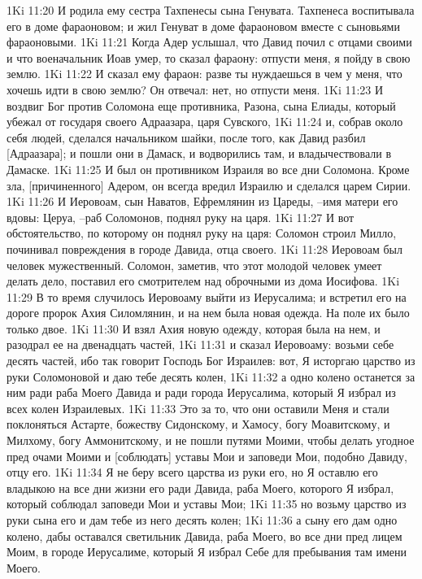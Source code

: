 1Ki 11:20  И родила ему сестра Тахпенесы сына Генувата. Тахпенеса воспитывала его в доме фараоновом; и жил Генуват в доме фараоновом вместе с сыновьями фараоновыми.
1Ki 11:21  Когда Адер услышал, что Давид почил с отцами своими и что военачальник Иоав умер, то сказал фараону: отпусти меня, я пойду в свою землю.
1Ki 11:22  И сказал ему фараон: разве ты нуждаешься в чем у меня, что хочешь идти в свою землю? Он отвечал: нет, но отпусти меня.
1Ki 11:23  И воздвиг Бог против Соломона еще противника, Разона, сына Елиады, который убежал от государя своего Адраазара, царя Сувского,
1Ki 11:24  и, собрав около себя людей, сделался начальником шайки, после того, как Давид разбил [Адраазара]; и пошли они в Дамаск, и водворились там, и владычествовали в Дамаске.
1Ki 11:25  И был он противником Израиля во все дни Соломона. Кроме зла, [причиненного] Адером, он всегда вредил Израилю и сделался царем Сирии.
1Ki 11:26  И Иеровоам, сын Наватов, Ефремлянин из Цареды, --имя матери его вдовы: Церуа, --раб Соломонов, поднял руку на царя.
1Ki 11:27  И вот обстоятельство, по которому он поднял руку на царя: Соломон строил Милло, починивал повреждения в городе Давида, отца своего.
1Ki 11:28  Иеровоам был человек мужественный. Соломон, заметив, что этот молодой человек умеет делать дело, поставил его смотрителем над оброчными из дома Иосифова.
1Ki 11:29  В то время случилось Иеровоаму выйти из Иерусалима; и встретил его на дороге пророк Ахия Силомлянин, и на нем была новая одежда. На поле их было только двое.
1Ki 11:30  И взял Ахия новую одежду, которая была на нем, и разодрал ее на двенадцать частей,
1Ki 11:31  и сказал Иеровоаму: возьми себе десять частей, ибо так говорит Господь Бог Израилев: вот, Я исторгаю царство из руки Соломоновой и даю тебе десять колен,
1Ki 11:32  а одно колено останется за ним ради раба Моего Давида и ради города Иерусалима, который Я избрал из всех колен Израилевых.
1Ki 11:33  Это за то, что они оставили Меня и стали поклоняться Астарте, божеству Сидонскому, и Хамосу, богу Моавитскому, и Милхому, богу Аммонитскому, и не пошли путями Моими, чтобы делать угодное пред очами Моими и [соблюдать] уставы Мои и заповеди Мои, подобно Давиду, отцу его.
1Ki 11:34  Я не беру всего царства из руки его, но Я оставлю его владыкою на все дни жизни его ради Давида, раба Моего, которого Я избрал, который соблюдал заповеди Мои и уставы Мои;
1Ki 11:35  но возьму царство из руки сына его и дам тебе из него десять колен;
1Ki 11:36  а сыну его дам одно колено, дабы оставался светильник Давида, раба Моего, во все дни пред лицем Моим, в городе Иерусалиме, который Я избрал Себе для пребывания там имени Моего.
